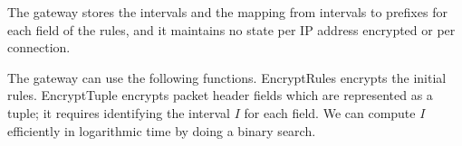 


The gateway stores the intervals and the mapping from intervals to prefixes for each field of the rules, and it maintains no state per IP address encrypted or per connection.

The gateway can use the following functions. EncryptRules encrypts the initial rules. EncryptTuple encrypts packet header fields which are represented as a tuple; it requires identifying the interval $I$ for each field. We can compute $I$ efficiently in logarithmic time by doing a binary search. 






